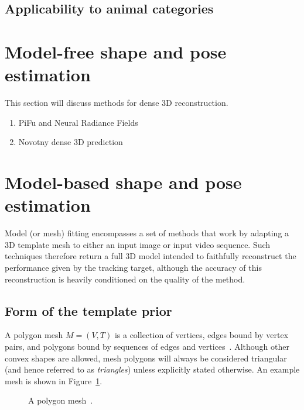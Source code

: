 
    \subsection{Applicability to animal categories}

\section{Model-free shape and pose estimation}

This section will discuss methods for dense 3D reconstruction. 

\begin{enumerate}
    \item PiFu and Neural Radiance Fields
    \item Novotny dense 3D prediction
\end{enumerate}

\section{Model-based shape and pose estimation}
    Model (or mesh) fitting encompasses a set of methods that work by adapting a 3D template mesh to either an input image or input video sequence. Such techniques therefore return a full 3D model intended to faithfully reconstruct the performance given by the tracking target, although the accuracy of this reconstruction is heavily conditioned on the quality of the method.
    

    \subsection{Form of the template prior}
    A polygon mesh $M = (V, T)$ is a collection of vertices, edges bound by vertex pairs, and polygons bound by sequences of edges and vertices~\cite{smith2006vertex}. Although other convex shapes are allowed, mesh polygons will always be considered triangular (and hence referred to as \emph{triangles}) unless explicitly stated otherwise. An example mesh is shown in Figure~\ref{fig:polygon_mesh}. 
    
    \begin{figure}[H] %
        \caption{A polygon mesh~\cite{polygon_mesh}.}
        \label{fig:polygon_mesh}
    \end{figure}

